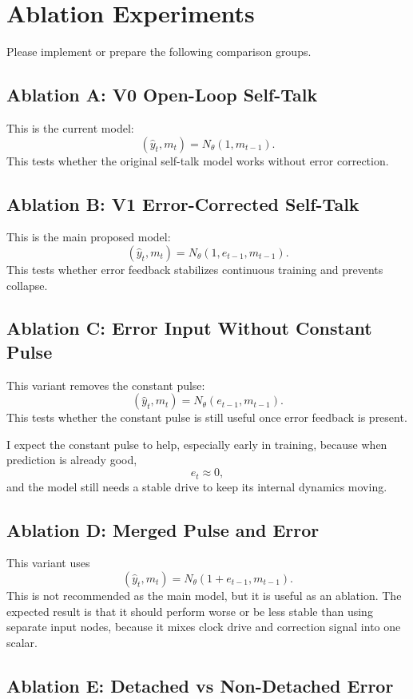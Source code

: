\documentclass[11pt]{article}
\begin{document}
\section{Ablation Experiments}

Please implement or prepare the following comparison groups.

\subsection{Ablation A: V0 Open-Loop Self-Talk}

This is the current model:
\[
(\hat y_t, m_t) = N_\theta(1, m_{t-1}).
\]
This tests whether the original self-talk model works without error correction.

\subsection{Ablation B: V1 Error-Corrected Self-Talk}

This is the main proposed model:
\[
(\hat y_t, m_t) = N_\theta(1, e_{t-1}, m_{t-1}).
\]
This tests whether error feedback stabilizes continuous training and prevents collapse.

\subsection{Ablation C: Error Input Without Constant Pulse}

This variant removes the constant pulse:
\[
(\hat y_t, m_t) = N_\theta(e_{t-1}, m_{t-1}).
\]
This tests whether the constant pulse is still useful once error feedback is present.

I expect the constant pulse to help, especially early in training, because when prediction is already good,
\[
e_t \approx 0,
\]
and the model still needs a stable drive to keep its internal dynamics moving.

\subsection{Ablation D: Merged Pulse and Error}

This variant uses
\[
(\hat y_t, m_t) = N_\theta(1+e_{t-1}, m_{t-1}).
\]
This is not recommended as the main model, but it is useful as an ablation. The expected result is that it should perform worse or be less stable than using separate input nodes, because it mixes clock drive and correction signal into one scalar.

\subsection{Ablation E: Detached vs Non-Detached Error}
\end{document}

